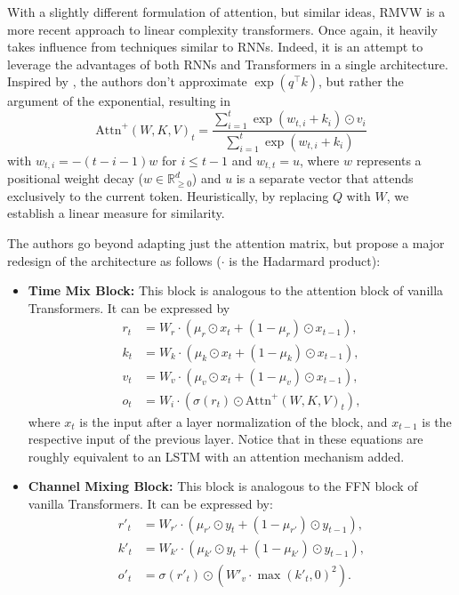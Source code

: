 With a slightly different formulation of attention, but similar ideas, RMVW \cite{Peng2023} is a more recent approach to linear complexity transformers. Once again, it heavily takes influence from techniques similar to RNNs. Indeed, it is an attempt to leverage the advantages of both RNNs and Transformers in a single architecture. Inspired by \cite{Zhai2021}, the authors don't approximate $\exp(q^\top k)$, but rather the argument of the exponential, resulting in
$$
    \text{Attn}^+ (W, K, V)_t = \frac{\sum_{i=1}^t \exp(w_{t, i} + k_i) \odot v_i}{\sum_{i=1}^t \exp(w_{t, i} + k_i)}
$$
with $w_{t, i} = -(t - i - 1)w$ for $i \leq t - 1$ and $w_{t, t} = u$, where $w$ represents a positional weight decay ($w \in \mathbb{R}_{\geq 0}^d$) and $u$ is a separate vector that attends exclusively to the current token. Heuristically, by replacing $Q$ with $W$, we establish a linear measure for similarity.

The authors go beyond adapting just the attention matrix, but propose a major redesign of the architecture as follows ($\cdot$ is the Hadarmard product):
\begin{itemize}
    \item \textbf{Time Mix Block:} This block is analogous to the attention block of vanilla Transformers. It can be expressed by 
    \begin{align*}
        r_t &= W_r \cdot (\mu_r \odot x_t + (1 - \mu_r) \odot x_{t-1}), \\ 
        k_t &= W_k \cdot (\mu_k \odot x_t + (1 - \mu_k) \odot x_{t-1}), \\ 
        v_t &= W_v \cdot (\mu_v \odot x_t + (1 - \mu_v) \odot x_{t-1}), \\ 
        o_t &= W_i \cdot (\sigma(r_t) \odot \text{Attn}^+ (W, K, V)_t),
    \end{align*}
    where $x_t$ is the input after a layer normalization of the block, and $x_{t-1}$ is the respective input of the previous layer.
    Notice that in these equations are roughly equivalent to an LSTM with an attention mechanism added.
    \item \textbf{Channel Mixing Block:} This block is analogous to the FFN block of vanilla Transformers. It can be expressed by:
    \begin{align*}
        r'_t &= W_{r'} \cdot (\mu_{r'} \odot y_t + (1 - \mu_{r'}) \odot y_{t-1}), \\ 
        k'_t &= W_{k'} \cdot (\mu_{k'} \odot y_t + (1 - \mu_{k'}) \odot y_{t-1}), \\ 
        o'_t &= \sigma(r'_t) \odot (W'_v \cdot \max(k'_t, 0)^2).
    \end{align*}
\end{itemize}

